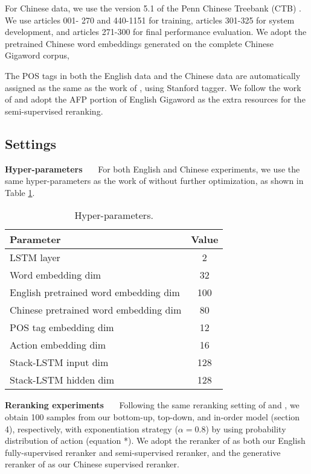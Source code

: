 \documentclass[11pt,letterpaper]{article}
\begin{document}
For Chinese data, we use the version 5.1 of the Penn Chinese Treebank (CTB) \cite{Xue:2005}.
We use articles 001- 270 and 440-1151 for training, articles 301-325 for system development, and articles 271-300 for final performance evaluation.
We adopt the pretrained Chinese word embeddings generated on the complete Chinese Gigaword corpus,

The POS tags in both the English data and the Chinese data are automatically assigned as the same as the work of , using Stanford tagger.
We follow the work of  and adopt the AFP portion of English Gigaword as the extra resources for the semi-supervised reranking.

\subsection{Settings}
\indent \textbf{Hyper-parameters}~~~
For both English and Chinese experiments, we use the same hyper-parameters as the work of  without further optimization, as shown in Table \ref{parameter}.
\begin{table}[!tp]
\begin{center}
\renewcommand{\arraystretch}{0.8}
\begin{tabular}{>{\small}l|>{\small}c}
\hline
Parameter & Value \\
\hline
\hline
LSTM layer & 2 \\
Word embedding dim & 32 \\
English pretrained word embedding dim & 100 \\
Chinese pretrained word embedding dim & 80 \\
POS tag embedding dim & 12 \\
Action embedding dim & 16 \\
Stack-LSTM input dim & 128 \\
Stack-LSTM hidden dim & 128 \\
\hline
\end{tabular}
\end{center}
\caption{\label{parameter} Hyper-parameters.}
\end{table}

\noindent\textbf{Reranking experiments}~~~
Following the same reranking setting of  and , we obtain 100 samples from our bottom-up, top-down, and in-order model (section 4), respectively, with exponentiation strategy ($\alpha=0.8$) by using probability distribution of action (equation *).
We adopt the reranker of  as both our English fully-supervised reranker and semi-supervised reranker, and the generative reranker of  as our Chinese supervised reranker.
\end{document}
